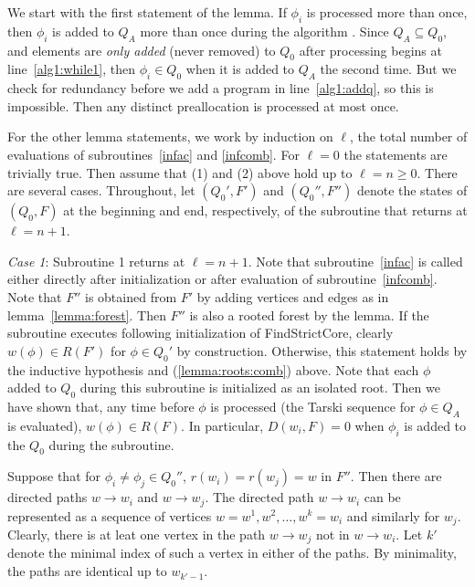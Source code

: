 \documentclass[11pt,reqno]{amsart}
\theoremstyle{definition}
\numberwithin{equation}{section}
\newcommand{\pre}{\phi}
\newcommand{\sub}{\subseteq}
\newcommand{\acto}{Q_0}
\newcommand{\acta}{Q_A}
\newcommand{\forest}{F}
\newcommand{\roott}{R}
\newcommand{\depth}{D}
\begin{document}
\begin{enumerate}
We start with the first statement of the lemma.  
If $\pre_i$ is processed more than once, then $\pre_i$ is added to $\acta$ more than once during the algorithm . 
Since $\acta \sub \acto$, and elements are \emph{only added} (never removed) to $\acto$ after processing begins at line~\ref{alg1:while1}, then $\pre_i \in \acto$ when it is added to $\acta$ the second time. 
But we check for redundancy before we add a program in line~\ref{alg1:addq}, so this is impossible. 
Then any distinct preallocation is processed at most once. 

For the other lemma statements, we work by induction on $\ell$, the total number of evaluations of subroutines~\ref{infac} and \ref{infcomb}. 
For $\ell = 0$ the statements are trivially true. 
Then assume that (1) and (2) above hold up to $\ell = n \geq 0$. 
There are several cases. 
Throughout, let $(\acto',\forest')$ and $(\acto'',\forest'')$ denote the states of $(\acto,\forest)$ at the beginning and end, respectively, of the subroutine that returns at $\ell = n + 1$.  

\emph{Case 1}: Subroutine 1 returns at $\ell = n + 1$. 
Note that subroutine~\ref{infac} is called either directly after initialization or after evaluation of subroutine~\ref{infcomb}. 
Note that $\forest''$ is obtained from $\forest'$ by adding vertices and edges as in lemma~\ref{lemma:forest}. 
Then $\forest''$ is also a rooted forest by the lemma.
If the subroutine executes following initialization of FindStrictCore, clearly $w(\pre) \in \roott(\forest')$ for $\pre \in \acto'$ by construction.
Otherwise, this statement holds by the inductive hypothesis and (\ref{lemma:roots:comb}) above. 
Note that each $\pre$ added to $\acto$ during this subroutine is initialized as an isolated root. 
Then we have shown that, any time before $\pre$ is processed (the Tarski sequence for $\pre \in \acta$ is evaluated), $w(\pre) \in \roott(\forest)$. 
In particular, $\depth(w_i, \forest) = 0$ when $\pre_i$ is added to the $\acto$ during the subroutine. 

Suppose that for $\pre_i \not = \pre_j \in \acto''$, $r(w_i) = r(w_j) = w$ in $\forest''$. 
Then there are directed paths $w \to w_i$ and $w \to w_j$. 
The directed path $w \to w_i$ can be represented as a sequence of vertices $w = w^1,w^2,\hdots, w^k = w_i$ and similarly for $w_j$. 
Clearly, there is at leat one vertex in the path $w \to w_j$ not in $w \to w_i$. 
Let $k'$ denote the minimal index of such a vertex in either of the paths. 
By minimality, the paths are identical up to $w_{k' - 1}$. 


\end{enumerate}
\end{document}
